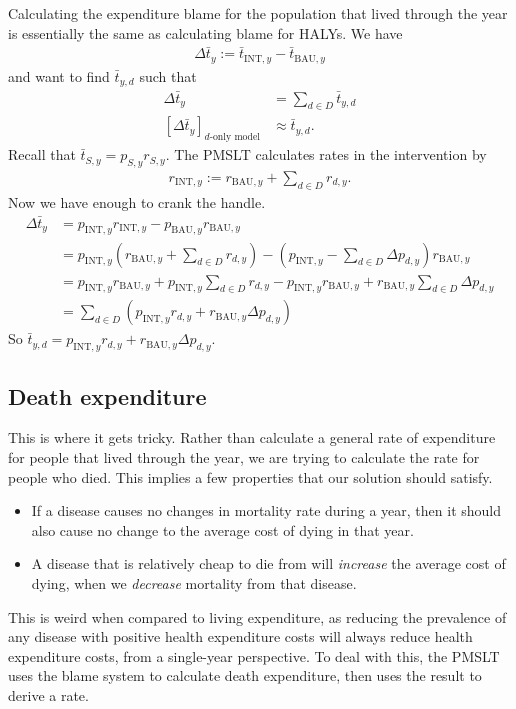 \documentclass[]{article}
\begin{document}
Calculating the expenditure blame for the population that lived through the year is essentially the same as calculating blame for HALYs. We have
\begin{align*}
	\Delta\bar{t}_y := \bar{t}_{\text{INT}, y} - \bar{t}_{\text{BAU}, y}
\end{align*}
and want to find $\bar{t}_{y, d}$ such that
\begin{align*}
	\Delta \bar{t}_y &= \sum_{d \in D} \bar{t}_{y, d} \\
	[\Delta \bar{t}_y]_\text{$d$-only model} &\approx \bar{t}_{y, d}.
\end{align*}
Recall that $\bar{t}_{S, y} = p_{S, y} r_{S, y}$. The PMSLT calculates rates in the intervention by
\begin{align*}
	r_{\text{INT}, y} := r_{\text{BAU}, y} + \sum_{d \in D} r_{d, y}.
\end{align*}
Now we have enough to crank the handle.
\begin{align*}
	\Delta \bar{t}_y &= p_{\text{INT}, y} r_{\text{INT}, y} - p_{\text{BAU}, y} r_{\text{BAU}, y} \\
	&= p_{\text{INT}, y}\left( r_{\text{BAU}, y} + \sum_{d \in D} r_{d, y}\right) - \left(p_{\text{INT}, y} - \sum_{d \in D} \Delta p_{d, y} \right) r_{\text{BAU}, y} \\
	&= p_{\text{INT}, y}r_{\text{BAU}, y} + p_{\text{INT}, y}\sum_{d \in D} r_{d, y} - p_{\text{INT}, y}r_{\text{BAU}, y} + r_{\text{BAU}, y}\sum_{d \in D} \Delta p_{d, y} \\
	&= \sum_{d \in D} \left(p_{\text{INT}, y}r_{d, y} + r_{\text{BAU}, y} \Delta p_{d, y}\right)
\end{align*}
So $\bar{t}_{y, d} = p_{\text{INT}, y}r_{d, y} + r_{\text{BAU}, y} \Delta p_{d, y}$.

\subsection{Death expenditure}

This is where it gets tricky. Rather than calculate a general rate of expenditure for people that lived through the year, we are trying to calculate the rate for people who died. This implies a few properties that our solution should satisfy.
\begin{itemize}
	\item If a disease causes no changes in mortality rate during a year, then it should also cause no change to the average cost of dying in that year.
	\item A disease that is relatively cheap to die from will \textit{increase} the average cost of dying, when we \textit{decrease} mortality from that disease.
\end{itemize}
This is weird when compared to living expenditure, as reducing the prevalence of any disease with positive health expenditure costs will always reduce health expenditure costs, from a single-year perspective. To deal with this, the PMSLT uses the blame system to calculate death expenditure, then uses the result to derive a rate.
\end{document}
